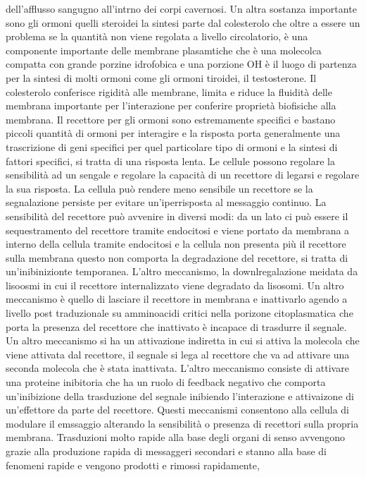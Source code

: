 dell'afflusso sangugno all'intrno dei corpi cavernosi. Un altra sostanza importante sono gli ormoni quelli steroidei la sintesi parte dal colesterolo che oltre a essere un problema se 
la quantit\`a non viene regolata a livello circolatorio, \`e una componente importante delle membrane plasamtiche che \`e una molecolca compatta con grande porzine idrofobica e una 
porzione OH \`e il luogo di partenza per la sintesi di molti ormoni come gli ormoni tiroidei, il testosterone. Il colesterolo conferisce rigidit\`a alle membrane, limita e riduce la 
fluidit\`a delle membrana importante per l'interazione per conferire propriet\`a biofisiche alla membrana. Il recettore per gli ormoni sono estremamente specifici e bastano piccoli 
quantit\`a di ormoni per interagire e la risposta porta generalmente una trascrizione di geni specifici per quel particolare tipo di ormoni e la sintesi di fattori specifici, si tratta
di una risposta lenta. Le cellule possono regolare la sensibilit\`a ad un sengale e regolare la capacit\`a di un recettore di legarsi e regolare la sua risposta. La cellula pu\`o rendere
meno sensibile un recettore se la segnalazione persiste per evitare un'iperrisposta al messaggio continuo. La sensibilit\`a del recettore pu\`o avvenire in diversi modi: da un lato ci 
pu\`o essere il sequestramento del recettore tramite endocitosi e viene portato da membrana a interno della cellula tramite endocitosi e la cellula non presenta pi\`u il recettore sulla
membrana questo non comporta la degradazione del recettore, si tratta di un'inibinizionte temporanea. L'altro meccanismo, la downlregalazione meidata da lisoosmi in cui il recettore 
internalizzato viene degradato da lisosomi. Un altro meccanismo \`e quello di lasciare il recettore in membrana e inattivarlo agendo a livello post traduzionale su amminoacidi 
critici nella porizone citoplasmatica che porta la presenza del recettore che inattivato \`e incapace di trasdurre il segnale. Un altro meccanismo si ha un attivazione indiretta in cui 
si attiva la molecola che viene attivata dal recettore, il segnale si lega al recettore che va ad attivare una seconda molecola che \`e stata inattivata. L'altro meccanismo consiste di 
attivare una proteine inibitoria che ha un ruolo di feedback negativo che comporta un'inibizione della trasduzione del segnale inibiendo l'interazione e attivaizone di un'effettore da 
parte del recettore. Questi meccanismi consentono alla cellula di modulare il emssaggio alterando la sensibilit\`a o presenza di recettori sulla propria membrana. Trasduzioni molto
rapide alla base degli organi di senso avvengono grazie alla produzione rapida di messaggeri secondari e stanno alla base di fenomeni rapide e vengono prodotti e rimossi rapidamente, 
